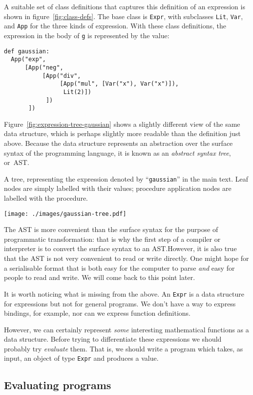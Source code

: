 \documentclass[11pt, a4paper]{article}
\newcommand{\cd}[1]{\texttt{#1}}
\begin{document}
A suitable set of class definitions that captures this definition of
an expression is shown in figure~\ref{fig:class-defs}. The base class
is \cd{Expr}, with subclasses \cd{Lit}, \cd{Var}, and \cd{App} for the
three kinds of expression. With these class definitions, the
expression in the body of \cd{g} is represented by the value:
\begin{verbatim}
def gaussian:
  App("exp",
      [App("neg",
           [App("div",
                [App("mul", [Var("x"), Var("x")]),
                 Lit(2)])
            ])
       ])
\end{verbatim}
Figure~\ref{fig:expression-tree-gaussian} shows a slightly different
view of the same data structure, which is perhaps slightly more
readable than the definition just above. Because the data structure
represents an abstraction over the surface syntax of the programming
language, it is known as an \emph{abstract syntax tree}, or~AST.
 \begin{marginfigure}
  \caption{A tree, representing the expression denoted by
    ``\cd{gaussian}'' in the main text. Leaf nodes are simply
    labelled with their values; procedure application nodes are
    labelled with the procedure.\label{fig:expression-tree-gaussian}}
  \centering
  \texttt{[image: ./images/gaussian-tree.pdf]}
\end{marginfigure}

The AST is more convenient than the surface syntax for the purpose of
programmatic transformation: that is why the first step of a compiler
or interpreter is to convert the surface syntax to an AST.\@ However,
it is also true that the AST is not very convenient to read or write
directly. One might hope for a serialisable format that is both easy
for the computer to parse \emph{and} easy for people to read and
write. We will come back to this point later.

It is worth noticing what is missing from the above. An \cd{Expr} is a
data structure for expressions but not for general programs. We don't
have a way to express bindings, for example, nor can we express
function definitions.

However, we can certainly represent \emph{some} interesting
mathematical functions as a data structure. Before trying to
differentiate these expressions we should probably try \emph{evaluate}
them. That is, we should write a program which takes, as input, an
object of type \cd{Expr} and produces a value.

\subsection{Evaluating programs}
\end{document}
